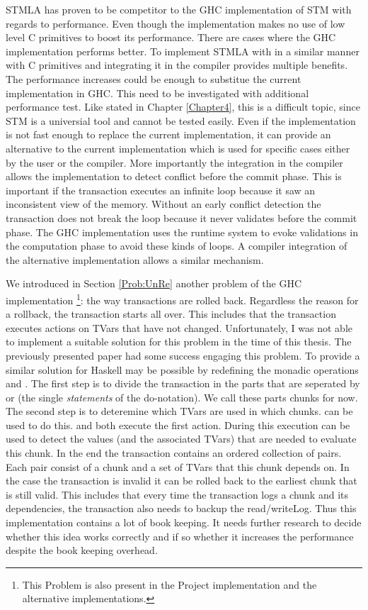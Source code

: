 STMLA has proven to be competitor to the GHC implementation of STM with regards to performance. Even 
though the implementation makes no use of low level C primitives to boost its performance. There are 
cases where the GHC implementation performs better. To implement STMLA with in a similar manner 
with C primitives and integrating it in the compiler provides multiple benefits. The performance 
increases could be enough to substitue the current implementation in GHC. This need to be investigated
with additional performance test. Like stated in Chapter \ref{Chapter4}, this is a difficult topic,
since STM is a universial tool and cannot be tested easily. Even if the implementation is not fast
enough to replace the current implementation, it can provide an alternative to the current implementation
which is used for specific cases either by the user or the compiler. More importantly the integration
in the compiler allows the implementation to detect conflict before the commit phase. This is 
important if the transaction executes an infinite loop because it saw an inconsistent view of the 
memory. Without an early conflict detection the transaction does not break the loop because it never
validates before the commit phase. The GHC implementation uses the runtime system to evoke validations
in the computation phase to avoid these kinds of loops. A compiler integration of the alternative 
implementation allows a similar mechanism.

We introduced in Section \ref{Prob:UnRe} another problem of the GHC implementation \footnote{This 
Problem is also present in the Project implementation and the alternative implementations.}: the way 
transactions are rolled back. Regardless the reason for a rollback, the transaction starts all
over. This includes that the transaction executes actions on TVars that have not changed. Unfortunately,
I was not able to implement a suitable solution for this problem in the time of this thesis. The previously
presented paper \parencite{checkpoint} had some success engaging this problem. To provide a similar 
solution for Haskell may be possible by redefining the monadic operations \code{>>} and \code{>>=}. 
The first step is to divide the transaction in the parts that are seperated by \code{>>} or \code{>>=} 
(the single \textit{statements} of the do-notation). We call these parts chunks for now. The second step 
is to deteremine which TVars are used in which chunks.  can be used to do this. 
\code{>>} and \code{>>=} both execute the first action. During this execution  can
be used to detect the values (and the associated TVars) that are needed to evaluate this chunk. In the
end the transaction contains an ordered collection of pairs. Each pair consist of a chunk and a set of
TVars that this chunk depends on. In the case the transaction is invalid it can be rolled back to the 
earliest chunk that is still valid. This includes that every time the transaction logs a chunk and its 
dependencies, the transaction also needs to backup the read/writeLog. Thus this implementation contains
a lot of book keeping. It needs further research to decide whether this idea works correctly and if so
whether it increases the performance despite the book keeping overhead.

